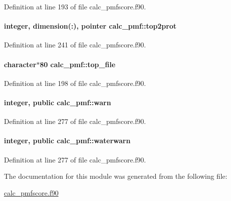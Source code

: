 Definition at line 193 of file calc\-\_\-pmfscore.\-f90.

\hypertarget{classcalc__pmf_abf00c9b4eae4e83c041e4b4b732672de}{
\paragraph[{top2prot}]{\setlength{\rightskip}{0pt plus 5cm}integer, dimension(\-:), pointer calc\-\_\-pmf\-::top2prot}}\label{classcalc__pmf_abf00c9b4eae4e83c041e4b4b732672de}


Definition at line 241 of file calc\-\_\-pmfscore.\-f90.

\hypertarget{classcalc__pmf_a5e4abdec940eb0d22b396ceda84d2e99}{
\paragraph[{top\-\_\-file}]{\setlength{\rightskip}{0pt plus 5cm}character$\ast$80 calc\-\_\-pmf\-::top\-\_\-file}}\label{classcalc__pmf_a5e4abdec940eb0d22b396ceda84d2e99}


Definition at line 198 of file calc\-\_\-pmfscore.\-f90.

\hypertarget{classcalc__pmf_a3f47ac8c9ec9c4a161656939a6dce7af}{
\paragraph[{warn}]{\setlength{\rightskip}{0pt plus 5cm}integer, public calc\-\_\-pmf\-::warn}}\label{classcalc__pmf_a3f47ac8c9ec9c4a161656939a6dce7af}


Definition at line 277 of file calc\-\_\-pmfscore.\-f90.

\hypertarget{classcalc__pmf_a3b88bd9f8668a6e062604271a4113c99}{
\paragraph[{waterwarn}]{\setlength{\rightskip}{0pt plus 5cm}integer, public calc\-\_\-pmf\-::waterwarn}}\label{classcalc__pmf_a3b88bd9f8668a6e062604271a4113c99}


Definition at line 277 of file calc\-\_\-pmfscore.\-f90.



The documentation for this module was generated from the following file\-:\begin{DoxyCompactItemize}
\item 
\hyperlink{calc__pmfscore_8f90}{calc\-\_\-pmfscore.\-f90}\end{DoxyCompactItemize}
